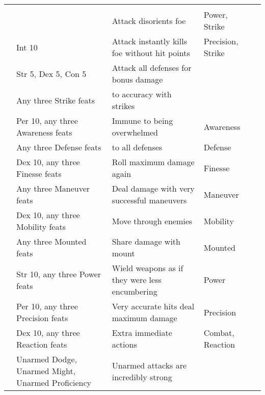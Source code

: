 \begin{longtabuwrapper}
\begin{longtabu}{>{\lcol}p{10em} >{\lcol}p{15em} >{\lcol}X >{\lcol}p{8em} >{\lcol}p{3em}}
        \midrule
         &  &  &  &  \\
         & \x & Attack disorients foe & Power, Strike &  \\
         & Int 10 & Attack instantly kills foe without hit points & Precision, Strike &  \\
         & Str 5, Dex 5, Con 5 & Attack all defenses for bonus damage & \x &  \\
         & Any three Strike feats &  to accuracy with strikes & \x &  \\
         & Per 10, any three Awareness feats & Immune to being overwhelmed & Awareness &  \\
         & Any three Defense feats &  to all defenses & Defense &  \\
         & Dex 10, any three Finesse feats & Roll maximum damage again & Finesse &  \\
         & Any three Maneuver feats & Deal damage with very successful maneuvers & Maneuver &  \\
         & Dex 10, any three Mobility feats & Move through enemies & Mobility&  \\
         & Any three Mounted feats & Share damage with mount & Mounted&  \\
         & Str 10, any three Power feats & Wield weapons as if they were less encumbering & Power&  \\
         & Per 10, any three Precision feats & Very accurate hits deal maximum damage & Precision &  \\
         & Dex 10, any three Reaction feats & Extra immediate actions & Combat, Reaction &  \\
         & Unarmed Dodge, Unarmed Might, Unarmed Proficiency & Unarmed attacks are incredibly strong & \x &  \\

\end{longtabu}
\end{longtabuwrapper}
